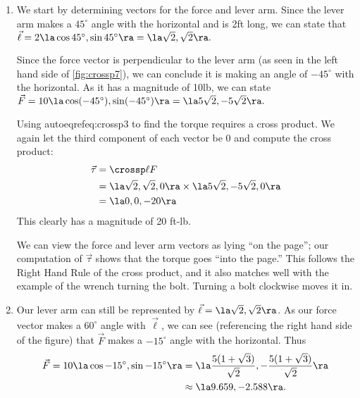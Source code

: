 {\begin{enumerate}
	\item We start by determining vectors for the force and lever arm. Since the lever arm makes a $45^\circ$ angle with the horizontal and is 2ft long, we can state that $\vec \ell = 2\la \cos 45^\circ,\sin 45^\circ\ra = \la \sqrt2,\sqrt2\ra.$
	
	Since the force vector is perpendicular to the lever arm (as seen in the left hand side of \autoref{fig:crossp7}), we can conclude it is making an angle of $-45^\circ$ with the horizontal. As it has a magnitude of 10lb, we can state $\vec F = 10\la \cos (-45^\circ), \sin(-45^\circ)\ra = \la 5\sqrt2,-5\sqrt2\ra.$
	
	Using autoeqref{eq:crossp3} to find the torque requires a cross product. We again let the third component of each vector be 0  and compute the cross product:
	\begin{align*}
	\vec\tau &= \crossp \ell F \\
				&= \la \sqrt2,\sqrt2,0\ra \times \la 5\sqrt2,-5\sqrt2,0\ra \\
				&= \la 0,0,-20\ra
	\end{align*}
	This clearly has a magnitude of 20 ft-lb.
		
	We can view the force and lever arm vectors as lying ``on the page''; our computation of $\vec\tau$ shows that the torque goes ``into the page.'' This follows the Right Hand Rule of the cross product, and it also matches well with the example of the wrench turning the bolt. Turning a bolt clockwise moves it in.
	
	\item		Our lever arm can still be represented by $\vec \ell = \la \sqrt2,\sqrt2\ra$. As our force vector makes a $60^\circ$ angle with $\vec \ell$, we can see (referencing the right hand side of the figure) that $\vec F$ makes a $-15^\circ$ angle with the horizontal. Thus 
	\begin{align*}
	\vec F = 10\la \cos-15^\circ,\sin-15^\circ\ra &= \la \frac{5(1+\sqrt3)}{\sqrt2},-\frac{5(1+\sqrt3)}{\sqrt2}\ra \\
	&\approx \la 9.659,-2.588\ra.\end{align*}
	

\end{enumerate}}
